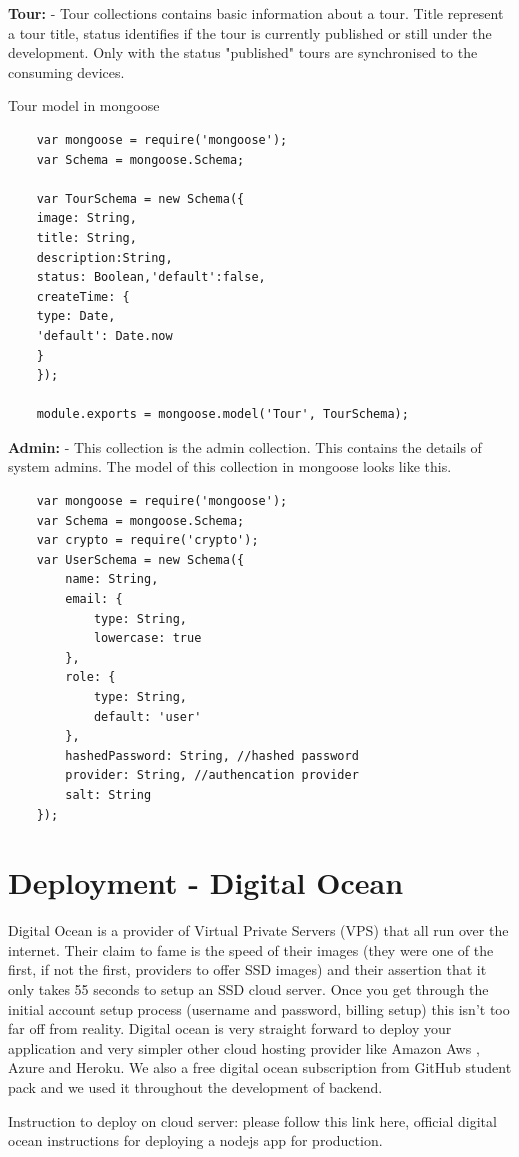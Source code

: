 		\textbf	{Tour:} - Tour collections contains basic information about a tour.  Title represent a tour title, status identifies if  the tour is currently published or still under the development. Only with the status "published" tours are synchronised to the consuming devices. 
		
		Tour model in mongoose
		\begin{verbatim}
	var mongoose = require('mongoose');
	var Schema = mongoose.Schema;
	
	var TourSchema = new Schema({
	image: String,
	title: String,
	description:String,
	status: Boolean,'default':false,
	createTime: {
	type: Date,
	'default': Date.now
	}
	});
	
	module.exports = mongoose.model('Tour', TourSchema);
	\end{verbatim}
	
		
		\textbf{Admin:} - This collection is the admin collection. This contains the details of system admins. The model of this collection in mongoose looks like this. 
		
	\begin{verbatim}
	var mongoose = require('mongoose');
	var Schema = mongoose.Schema;
	var crypto = require('crypto');
	var UserSchema = new Schema({
		name: String,  
		email: {
			type: String,
			lowercase: true
		},
		role: {
			type: String,
			default: 'user'
		},
		hashedPassword: String, //hashed password
		provider: String, //authencation provider
		salt: String
	});
	\end{verbatim}
		
\section{Deployment - Digital Ocean}
	Digital Ocean is a provider of Virtual Private Servers (VPS) that all run over the internet. Their claim to fame is the speed of their images (they were one of the first, if not the first, providers to offer SSD images) and their assertion that it only takes 55 seconds to setup an SSD cloud server. Once you get through the initial account setup process (username and password, billing setup) this isn’t too far off from reality.  Digital ocean is very straight forward to deploy your application and very simpler other cloud hosting provider like Amazon Aws , Azure and Heroku. We also a free digital ocean subscription from GitHub student pack and we used it throughout the development of backend. 
	
	Instruction to deploy on cloud server:
	please follow this link here, official digital ocean instructions for deploying a nodejs app for production.
	
